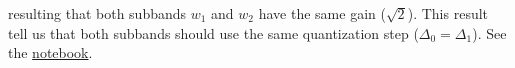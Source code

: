 resulting that both subbands $w_1$ and $w_2$ have the same gain
($\sqrt{2}$). This result tell us that both subbands should use the
same quantization step ($\Delta_0=\Delta_1$). See the
\href{https://github.com/Tecnologias-multimedia/intercom/blob/master/docs/stereo_transforms_RD.ipynb}{notebook}.

\begin{comment}
Unfortunately, this
estatement is only true if the
\href{https://en.wikipedia.org/wiki/Entropy_encoding}{entropy coding}
stage generates the same number of bits for both subbands, something
that rarely happens because we are compressing the coefficients of the
subbands considering the complete chunk (remember that we are
exploiting the
\href{https://en.wikipedia.org/wiki/Correlation_and_dependence}{statistical
  correlation} between the sequence of coefficients generated by all
the frames of a chunk). In general, the amount of information provided
by each subband $w_i$ is different, and therefore, the discrete
\href{https://en.wikipedia.org/wiki/Rate%E2%80%93distortion_theory}{Rate
  Distortion} (RD) curve\footnote{A discrete RD curve is defined by
the
\href{https://en.wikipedia.org/wiki/Multi-objective_optimization}{Pareto
  front} form by the RD points.} generated by each subband is distint.

The standard solution for this problem is to select a $\Delta_i$ value
for each $w_i$ that select RD points with the same RD
\href{https://en.wikipedia.org/wiki/Slope}{slope}~\cite{vetterli2014foundations,sayood2017introduction}.
A RD point is defined as a pair or $(r,d)$ values where $r$ represents
a bit-rate (typically expressed in bits/sample) and $d$ represents a
distortion (that uses to be the
\href{https://en.wikipedia.org/wiki/Root-mean-square_deviation}{RMSE}
when we use the L$_2$ norm to measure distances). Therefore, to find
the two RD curves for the current chunk, we should apply the stereo
transform, use a set of quantization steps to each subband, and
compress the resulting quantization indexes for each quantization
step. This would find the $r$ values of our RD curve. Then,
decompress, dequantize and find the distortion for the chunk. This
would find the $d$ values. Finally, with this RD curve, we should
select the $\Delta_i$ values that provides the same slope for both
subbands.


\end{comment}
